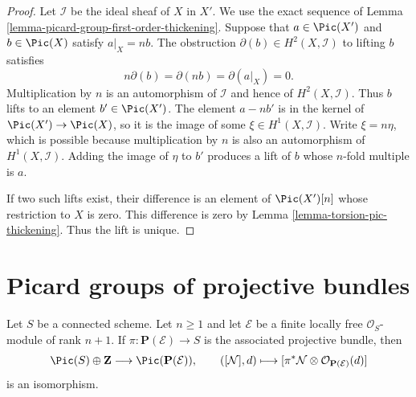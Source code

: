 \begin{proof}
Let $\mathcal{I}$ be the ideal sheaf of $X$ in $X'$. We use the exact
sequence of Lemma \ref{lemma-picard-group-first-order-thickening}.
Suppose that $a \in \Pic(X')$ and $b \in \Pic(X)$ satisfy
$a|_X = nb$. The obstruction $\partial(b) \in H^2(X, \mathcal{I})$
to lifting $b$ satisfies
$$
n\partial(b) = \partial(nb) = \partial(a|_X) = 0.
$$
Multiplication by $n$ is an automorphism of $\mathcal{I}$ and hence of
$H^2(X, \mathcal{I})$. Thus $b$ lifts to an element
$b' \in \Pic(X')$. The element $a - nb'$ is in the kernel of
$\Pic(X') \to \Pic(X)$, so it is the image of some
$\xi \in H^1(X, \mathcal{I})$. Write $\xi = n\eta$, which is possible
because multiplication by $n$ is also an automorphism of
$H^1(X, \mathcal{I})$. Adding the image of $\eta$ to $b'$ produces a
lift of $b$ whose $n$-fold multiple is $a$.

If two such lifts exist, their difference is an element of
$\Pic(X')[n]$ whose restriction to $X$ is zero. This difference is zero
by Lemma \ref{lemma-torsion-pic-thickening}. Thus the lift is unique.
\end{proof}





\section{Picard groups of projective bundles}
\label{section-picard-projective-bundles}

\begin{lemma}
\label{lemma-picard-group-projective-bundle}
Let $S$ be a connected scheme. Let $n \geq 1$ and let $\mathcal{E}$ be a
finite locally free $\mathcal{O}_S$-module of rank $n + 1$. If
$\pi : \mathbf{P}(\mathcal{E}) \to S$ is the associated projective bundle,
then
$$
\Pic(S) \oplus \mathbf{Z} \longrightarrow \Pic(\mathbf{P}(\mathcal{E})),
\qquad
([\mathcal{N}], d) \longmapsto
[\pi^*\mathcal{N} \otimes \mathcal{O}_{\mathbf{P}(\mathcal{E})}(d)]
$$
is an isomorphism.
\end{lemma}

